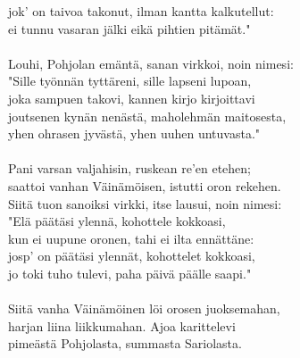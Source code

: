 jok' on taivoa takonut, ilman kantta kalkutellut:         \\
ei tunnu vasaran jälki eikä pihtien pitämät."             \\
                                                          \\
Louhi, Pohjolan emäntä, sanan virkkoi, noin nimesi:       \\
"Sille työnnän tyttäreni, sille lapseni lupoan,           \\
joka sampuen takovi, kannen kirjo kirjoittavi             \\
joutsenen kynän nenästä, maholehmän maitosesta,           \\
yhen ohrasen jyvästä, yhen uuhen untuvasta."              \\
                                                          \\
Pani varsan valjahisin, ruskean re'en etehen;             \\
saattoi vanhan Väinämöisen, istutti oron rekehen.         \\
Siitä tuon sanoiksi virkki, itse lausui, noin nimesi:     \\
"Elä päätäsi ylennä, kohottele kokkoasi,                  \\
kun ei uupune oronen, tahi ei ilta ennättäne:             \\
josp' on päätäsi ylennät, kohottelet kokkoasi,            \\
jo toki tuho tulevi, paha päivä päälle saapi."            \\
                                                          \\
Siitä vanha Väinämöinen löi orosen juoksemahan,           \\
harjan liina liikkumahan. Ajoa karittelevi                \\
pimeästä Pohjolasta, summasta Sariolasta.                 \\